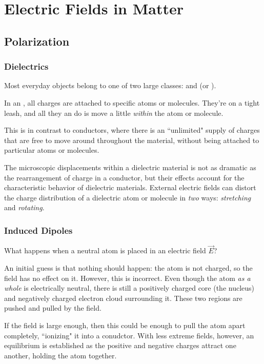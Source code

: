 \chapter{Electric Fields in Matter}

\section{Polarization}

\subsection{Dielectrics}

Most everyday objects belong to one of two large classes:  and  (or ).

\begin{definition}
In an , all charges are attached to specific atoms or molecules. They're on a tight leash, and all they an do is move a little \textit{within} the atom or molecule.
\end{definition}

This is in contrast to conductors, where there is an ``unlimited" supply of charges that are free to move around throughout the material, without being attached to particular atoms or molecules.

The microscopic displacements within a dielectric material is not as dramatic as the rearrangement of charge in a conductor, but their effects account for the characteristic behavior of dielectric materials. External electric fields can distort the charge distribution of a dielectric atom or molecule in \textit{two} ways: \textit{stretching} and \textit{rotating}.

\subsection{Induced Dipoles}

What happens when a neutral atom is placed in an electric field $\vec{E}$? 

An initial guess is that nothing should happen: the atom is not charged, so the field has no effect on it. However, this is incorrect. Even though the atom \textit{as a whole} is electrically neutral, there is still a positively charged core (the nucleus) and negatively charged electron cloud surrounding it. These two regions are pushed and pulled by the field.

If the field is large enough, then this could be enough to pull the atom apart completely, ``ionizing" it into a conudctor. With less extreme fields, however, an equilibrium is established as the positive and negative charges attract one another, holding the atom together. 

